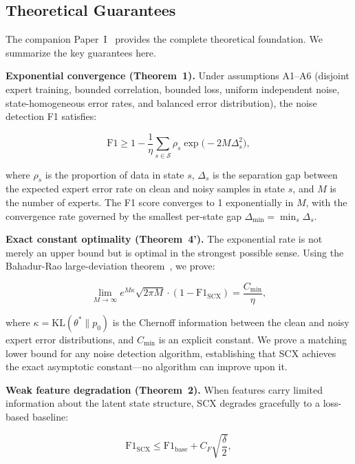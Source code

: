 \documentclass[12pt,a4paper]{article}
\begin{document}
\subsection{Theoretical Guarantees}

The companion Paper~I~\cite{xi2025fundamental} provides the complete theoretical foundation. We summarize the key guarantees here.

\textbf{Exponential convergence (Theorem~1).} Under assumptions A1--A6 (disjoint expert training, bounded correlation, bounded loss, uniform independent noise, state-homogeneous error rates, and balanced error distribution), the noise detection F1 satisfies:

\begin{equation}
\mathrm{F1} \geq 1 - \frac{1}{\eta} \sum_{s \in \mathcal{S}} \rho_s \exp\!\bigl(-2M\Delta_s^2\bigr),
\label{eq:thm1}
\end{equation}

where $\rho_s$ is the proportion of data in state $s$, $\Delta_s$ is the separation gap between the expected expert error rate on clean and noisy samples in state $s$, and $M$ is the number of experts. The F1 score converges to 1 exponentially in $M$, with the convergence rate governed by the smallest per-state gap $\Delta_{\min} = \min_s \Delta_s$.

\textbf{Exact constant optimality (Theorem~4').} The exponential rate is not merely an upper bound but is optimal in the strongest possible sense. Using the Bahadur-Rao large-deviation theorem~\cite{bahadur1960deviations}, we prove:

\begin{equation}
\lim_{M\to\infty} e^{M\kappa} \sqrt{2\pi M} \cdot (1 - \mathrm{F1}_{\mathrm{SCX}}) = \frac{C_{\min}}{\eta},
\label{eq:thm4prime}
\end{equation}

where $\kappa = \mathrm{KL}(\theta^*\|p_0)$ is the Chernoff information between the clean and noisy expert error distributions, and $C_{\min}$ is an explicit constant. We prove a matching lower bound for any noise detection algorithm, establishing that SCX achieves the exact asymptotic constant---no algorithm can improve upon it.

\textbf{Weak feature degradation (Theorem~2).} When features carry limited information about the latent state structure, SCX degrades gracefully to a loss-based baseline:

\begin{equation}
\mathrm{F1}_{\mathrm{SCX}} \leq \mathrm{F1}_{\mathrm{base}} + C_F \sqrt{\frac{\delta}{2}},
\label{eq:thm2}
\end{equation}
\end{document}
